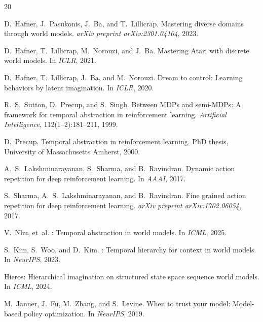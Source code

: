 \documentclass{article}
\begin{document}
\begin{thebibliography}{20}

D.~Hafner, J.~Pasukonis, J.~Ba, and T.~Lillicrap.
\newblock Mastering diverse domains through world models.
\newblock \emph{arXiv preprint arXiv:2301.04104}, 2023.

D.~Hafner, T.~Lillicrap, M.~Norouzi, and J.~Ba.
\newblock Mastering {A}tari with discrete world models.
\newblock In \emph{ICLR}, 2021.

D.~Hafner, T.~Lillicrap, J.~Ba, and M.~Norouzi.
\newblock Dream to control: Learning behaviors by latent imagination.
\newblock In \emph{ICLR}, 2020.

R.~S.~Sutton, D.~Precup, and S.~Singh.
\newblock Between {MDP}s and semi-{MDP}s: A framework for temporal abstraction in reinforcement learning.
\newblock \emph{Artificial Intelligence}, 112(1--2):181--211, 1999.

D.~Precup.
\newblock Temporal abstraction in reinforcement learning.
\newblock PhD thesis, University of Massachusetts Amherst, 2000.

A.~S.~Lakshminarayanan, S.~Sharma, and B.~Ravindran.
\newblock Dynamic action repetition for deep reinforcement learning.
\newblock In \emph{AAAI}, 2017.

S.~Sharma, A.~S.~Lakshminarayanan, and B.~Ravindran.
\newblock Fine grained action repetition for deep reinforcement learning.
\newblock \emph{arXiv preprint arXiv:1702.06054}, 2017.

V.~Nhu, et~al.
: Temporal abstraction in world models.
\newblock In \emph{ICML}, 2025.

S.~Kim, S.~Woo, and D.~Kim.
: Temporal hierarchy for context in world models.
\newblock In \emph{NeurIPS}, 2023.

Hieros: Hierarchical imagination on structured state space sequence world models.
\newblock In \emph{ICML}, 2024.

M.~Janner, J.~Fu, M.~Zhang, and S.~Levine.
\newblock When to trust your model: Model-based policy optimization.
\newblock In \emph{NeurIPS}, 2019.


\end{thebibliography}
\end{document}
